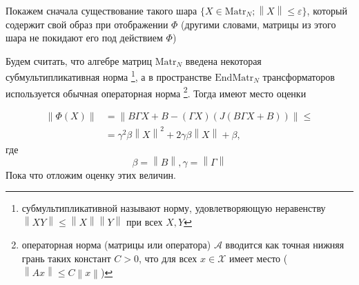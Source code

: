 Покажем сначала существование такого шара \( \{ X\in\mathrm{Matr}_{N}; {\left\|X\right\|} \leq \varepsilon \} \),
который содержит свой образ при отображении \( \Phi \)
(другими словами, матрицы из этого шара
 не покидают его под действием \( \Phi \))

Будем считать, что алгебре матриц \( \mathrm{Matr}_{N} \)
введена некоторая субмультипликативная норма
\footnote{субмультипликативной называют норму, удовлетворяющую неравенству \( {\left\|XY\right\|}\leq {\left\|X\right\|}{\left\|Y\right\|} \) при всех \( X, Y \) },
а в пространстве \( \mathrm{End}{\mathrm{Matr}_{N}} \) трансформаторов
используется обычная операторная норма%
\footnote{операторная норма
(матрицы или оператора) \( \mathcal A \)
вводится как точная нижняя грань таких констант \( C > 0 \),
что для всех \( x\in\mathscr X\) имеет место
(\( {\left\|A x\right\|} \leq C {\left\|x\right\|} \))}.
Тогда имеют место оценки

\begin{align*}
    {\left\|\Phi(X)\right\|} &= {\left\|B \Gamma X + B - (\Gamma X) (J(B\Gamma X + B))\right\|} \leq \\
    &= \gamma^2\beta{\left\|X\right\|}^2 + 2\gamma\beta{\left\|X\right\|} + \beta,
\end{align*}
где \[ \beta={\left\|B\right\|}, \gamma={\left\|\Gamma\right\|} \]
Пока что отложим оценку этих величин.

